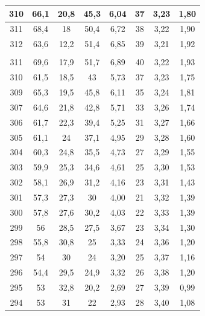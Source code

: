 \documentclass{letnab}
\begin{document}
\begin{table}[H]
\begin{tabular}{|c|c|c|c|c|c|c|c|}
		310    & 66,1                     & 20,8                 & 45,3      & 6,04     & 37             & 3,23           & 1,80    \\ \hline
		311    & 68,4                     & 18                   & 50,4      & 6,72     & 38             & 3,22           & 1,90    \\ \hline
		312    & 63,6                     & 12,2                 & 51,4      & 6,85     & 39             & 3,21           & 1,92    \\ \specialrule{.2em}{.1em}{.1em}
		\multicolumn{8}{|c|}{данные при понижении температуры} \\ \hline
		311  & 69,6    & 17,9   & 51,7          & 6,89  & 40    & 3,22     & 1,93 \\ \hline
		310  & 61,5    & 18,5   & 43            & 5,73  & 37    & 3,23     & 1,75 \\ \hline
		309  & 65,3    & 19,5   & 45,8          & 6,11  & 35    & 3,24     & 1,81 \\ \hline
		307  & 64,6    & 21,8   & 42,8          & 5,71  & 33    & 3,26     & 1,74 \\ \hline
		306  & 61,7    & 22,3   & 39,4          & 5,25  & 31    & 3,27     & 1,66 \\ \hline
		305  & 61,1    & 24     & 37,1          & 4,95  & 29    & 3,28     & 1,60 \\ \hline
		304  & 60,3    & 24,8   & 35,5          & 4,73  & 27    & 3,29     & 1,55 \\ \hline
		303  & 59,9    & 25,3   & 34,6          & 4,61  & 25    & 3,30     & 1,53 \\ \hline
		302  & 58,1    & 26,9   & 31,2          & 4,16  & 23    & 3,31     & 1,43 \\ \hline
		301  & 57,3    & 27,3   & 30            & 4,00  & 21    & 3,32     & 1,39 \\ \hline
		300  & 57,8    & 27,6   & 30,2          & 4,03  & 22    & 3,33     & 1,39 \\ \hline
		299  & 56      & 28,5   & 27,5          & 3,67  & 23    & 3,34     & 1,30 \\ \hline
		298  & 55,8    & 30,8   & 25            & 3,33  & 24    & 3,36     & 1,20 \\ \hline
		297  & 54      & 30     & 24            & 3,20  & 25    & 3,37     & 1,16 \\ \hline
		296  & 54,4    & 29,5   & 24,9          & 3,32  & 26    & 3,38     & 1,20 \\ \hline
		295  & 53      & 32,8   & 20,2          & 2,69  & 27    & 3,39     & 0,99 \\ \hline
		294  & 53      & 31     & 22            & 2,93  & 28    & 3,40     & 1,08 \\ \hline
	\end{tabular}
\end{table}
\newpage
\end{document}
